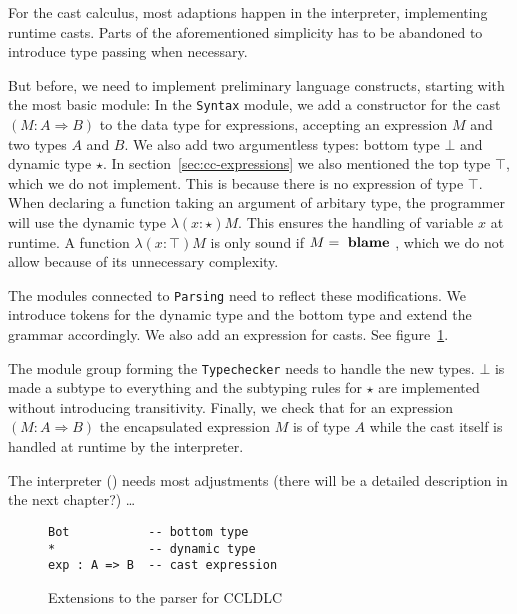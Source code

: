 For the cast calculus, most adaptions happen in the interpreter, implementing runtime casts. Parts of the aforementioned simplicity has to be abandoned to introduce type passing when necessary.

But before, we need to implement preliminary language constructs, starting with the most basic module: In the \texttt{Syntax} module, we add a constructor for the cast $(M : A \Rightarrow B)$ to the data type for expressions, accepting an expression $M$ and two types $A$ and $B$. We also add two argumentless types: bottom type $\bot$ and dynamic type $\star$. In section~\ref{sec:cc-expressions} we also mentioned the top type $\top$, which we do not implement. This is because there is no expression of type $\top$. When declaring a function taking an argument of arbitary type, the programmer will use the dynamic type $\lambda(x:\star)M$. This ensures the handling of variable $x$ at runtime. A function $\lambda(x:\top)M$ is only sound if $M = \text{ \textbf{blame} }$, which we do not allow because of its unnecessary complexity.

The modules connected to \texttt{Parsing} need to reflect these modifications. We introduce tokens for the dynamic type and the bottom type and extend the grammar accordingly. We also add an expression for casts. See figure~\ref{fig:ccldlc-grammar}.

The module group forming the \texttt{Typechecker} needs to handle the new types. $\bot$ is made a subtype to everything and the subtyping rules for $\star$ are implemented without introducing transitivity. Finally, we check that for an expression $(M : A \Rightarrow B)$ the encapsulated expression $M$ is of type $A$ while the cast itself is handled at runtime by the interpreter.

The interpreter () needs most adjustments (there will be a detailed description in the next chapter?) \dots


\begin{figure}
\begin{lstlisting}[language=ldgv]
Bot           -- bottom type
*             -- dynamic type
exp : A => B  -- cast expression
\end{lstlisting}
\caption{Extensions to the parser for CCLDLC}
\label{fig:ccldlc-grammar}
\end{figure}
